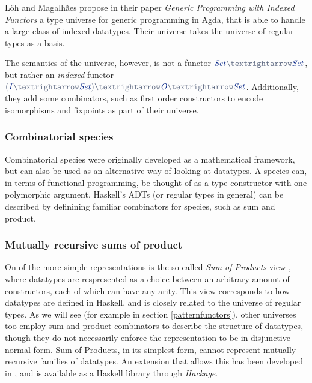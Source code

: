\documentclass[a4paper,msc,twosized=semi]{uustthesis}
\let\oldemph\emph
\renewcommand\emph[1]{{\large\oldemph{#1}}}
\newcommand*{\mathcolor}{}
\def\mathcolor#1#{\mathcoloraux{#1}}
\newcommand*{\mathcoloraux}[3]{%
  \protect\leavevmode
  \begingroup
    \color#1{#2}#3%
  \endgroup
}
\newcommand{\HSSpecial}[1]{\mathcolor{hsblue4}{#1}}
\newcommand{\HSSym}[1]{\mathcolor{hsblue4}{#1}}
\newcommand{\HSCon}[1]{\mathcolor{hsblue3}{\mathit{#1}}}
\begin{document}
  Löh and Magalhães propose in their paper \emph{Generic Programming with Indexed 
  Functors} \cite{loh2011generic} a type universe for generic programming in Agda, 
  that is able to handle a large class of indexed datatypes. Their universe takes the 
  universe of regular types as a basis. 
  
  The semantics of the universe, however, is not a functor \ensuremath{\HSCon{Set}\HSSym{→}\HSCon{Set}}, but rather an 
  \emph{indexed} functor \ensuremath{\HSSpecial{(}\HSCon{I}\HSSym{→}\HSCon{Set}\HSSpecial{)}\HSSym{→}\HSCon{O}\HSSym{→}\HSCon{Set}}. Additionally, they add some 
  combinators, such as first order constructors to encode isomorphisms and fixpoints 
  as part of their universe. 

\subsubsection{Combinatorial species}

  Combinatorial species \cite{yorgey2010species} were 
  originally developed as a mathematical framework, but can also be used as an 
  alternative way of looking at datatypes. A species can, in terms of functional 
  programming, be thought of as a type constructor with one polymorphic argument. 
  Haskell’s ADTs (or regular types in general) can be described by definining familiar 
  combinators for species, such as sum and product.

\subsubsection{Mutually recursive sums of product}

  On of the more simple representations is the so called \textit{Sum of Products} view 
  \cite{de2014true}, where datatypes are respresented as a choice between an arbitrary 
  amount of constructors, each of which can have any arity. This view corresponds to 
  how datatypes are defined in Haskell, and is closely related to the universe of 
  regular types. As we will see (for example in section \ref{patternfunctors}), other 
  universes too employ sum and product combinators to describe the structure of 
  datatypes, though they do not necessarily enforce the representation to be in 
  disjunctive normal form. Sum of Products, in its simplest form, cannot represent 
  mutually recursive families of datatypes. An extension that allows this has been 
  developed in \cite{miraldo2018sums}, and is available as a Haskell library through 
  \emph{Hackage}.  
\end{document}
